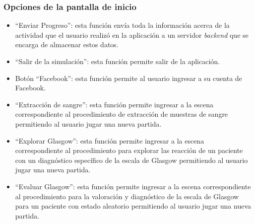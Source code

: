 



\subsubsection{Opciones de la pantalla de inicio}



\begin{itemize}
\item \enquote{Enviar Progreso}: esta función envía toda la información
    acerca de la actividad que el usuario realizó en la aplicación a un servidor
    \emph{backend} que se encarga de almacenar estos datos.
\item \enquote{Salir de la simulación}: esta función permite salir de la
    aplicación.
\item Botón \enquote{Facebook}: esta función permite al usuario ingresar a su
    cuenta de Facebook.
\item \enquote{Extracción de sangre}: esta función permite ingresar a la
    escena correspondiente al procedimiento de extracción de muestras de sangre
    permitiendo al usuario jugar una nueva partida.
\item \enquote{Explorar Glasgow}: esta función permite ingresar a la
    escena correspondiente al procedimiento para explorar las reacción de un
    paciente con un diagnóstico específico de la escala de Glasgow permitiendo
    al usuario jugar una nueva partida.%
\item \enquote{Evaluar Glasgow}: esta función permite ingresar a la escena
    correspondiente al procedimiento para la valoración y diagnóstico de la
    escala de Glasgow para un paciente con estado aleatorio permitiendo al
    usuario jugar una nueva partida.
\end{itemize}


